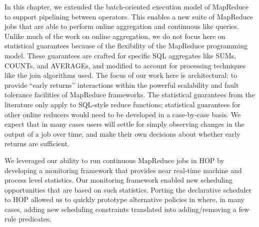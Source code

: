 In this chapter, we extended the batch-oriented execution model of MapReduce to 
support pipelining between operators. This enables a new suite of MapReduce jobs
that are able to perform online aggregation and continuous like queries. Unlike much of the work on 
online aggregation, we do not focus here on statistical guarantees because of the 
flexibility of the MapReduce programming model.  These guarantees are crafted for specific 
SQL aggregates like SUMs, COUNTs, and AVERAGEs, and modified to account for processing 
techniques like the join algorithms used.  The focus of our work here is architectural: to provide 
``early returns'' interactions within the powerful scalability and fault tolerance facilities of MapReduce 
frameworks.  The statistical guarantees from the literature only apply to SQL-style reduce functions; 
statistical guarantees for other online reducers would need to be developed in a case-by-case basis.  
We expect that in many cases users will settle for simply observing changes in the output of a job over 
time, and make their own decisions about whether early returns are sufficient.

We leveraged our ability to run continuous MapReduce jobs in HOP by developing a monitoring
framework that provides near real-time machine and process level statistics. Our monitoring framework
enabled new scheduling opportunities that are based on such statistics. Porting the declarative scheduler to HOP
allowed us to quickly prototype alternative policies in \OVERLOG where, in many cases, adding new scheduling 
constraints translated into adding/removing a few rule predicates. 



